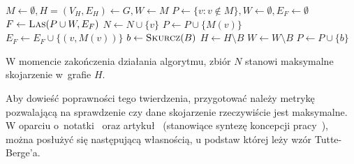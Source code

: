 {\begin{algorithm}
\begin{algorithmic}[1]
        \State $M \gets \emptyset, H=(V_H, E_H) \gets G, W \gets M$
        \State $P \gets \{v: v \notin M\}, W \gets \emptyset, E_F \gets \emptyset$\label{init_edmonds}
        \State $F \gets \Call{Las}{P \cup W, E_F}$
        \label{pick_edge}
        \EndIf
        \label{put_matched_in_odd}
          \State $N \gets N \cup \{v\}$
          \State $P \gets P \cup \{M(v)\}$
          \State $E_F \gets E_F \cup \{(v, M(v))\}$
        \label{even_connected}
          \State $b \gets \Call{Skurcz}{B}$
          \State $H \gets H\setminus B$
          \State $W \gets W\setminus B$
          \State $P \gets P \cup \{b\}$
        \label{even_disjoint}
          \State{}
        \EndIf
      \EndFunction
    \end{algorithmic}
  \end{algorithm}
  \begin{theorem}
    W momencie zakończenia działania algorytmu, zbiór $N$ stanowi maksymalne skojarzenie w~grafie $H$.
  \end{theorem}
  Aby dowieść poprawności tego twierdzenia, przygotować należy metrykę pozwalającą na sprawdzenie czy dane skojarzenie rzeczywiście jest maksymalne.
  W oparciu o~notatki~\cite{Tutte-Berge:notes} oraz artykuł~\cite{cohen:hal-00358468} (stanowiące syntezę koncepcji pracy~\cite{Tutte-Berge:original}),  można posłużyć się następującą własnością, u podstaw której leży wzór Tutte-Berge'a.

}

